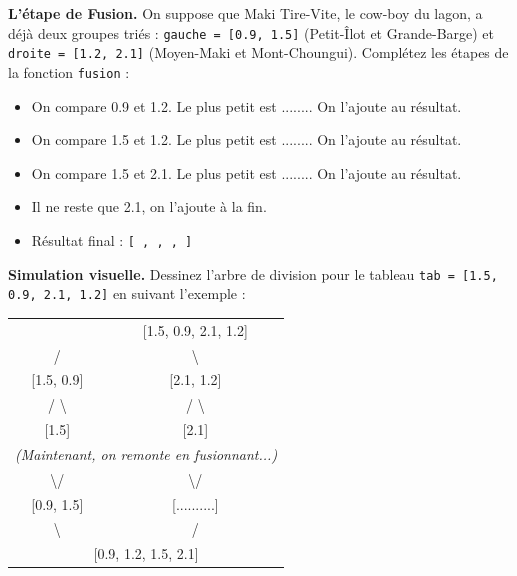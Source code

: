 \begin{Exercise}[title={La stratégie de Maki Tire-Vite, le cow-boy du lagon}]

\Question \textbf{L'étape de Fusion.} 
On suppose que Maki Tire-Vite, le cow-boy du lagon, a déjà deux groupes triés : \texttt{gauche = [0.9, 1.5]} (Petit-Îlot et Grande-Barge) et \texttt{droite = [1.2, 2.1]} (Moyen-Maki et Mont-Choungui).
Complétez les étapes de la fonction \texttt{fusion} :
\begin{itemize}
    \item On compare 0.9 et 1.2. Le plus petit est ........ On l'ajoute au résultat.
    \item On compare 1.5 et 1.2. Le plus petit est ........ On l'ajoute au résultat.
    \item On compare 1.5 et 2.1. Le plus petit est ........ On l'ajoute au résultat.
    \item Il ne reste que 2.1, on l'ajoute à la fin.
    \item Résultat final : \texttt{[ \quad , \quad , \quad , \quad ]}
\end{itemize}

\Question \textbf{Simulation visuelle.}
Dessinez l'arbre de division pour le tableau \texttt{tab = [1.5, 0.9, 2.1, 1.2]} en suivant l'exemple :



\begin{center}
\begin{tabular}{cc}
      & [1.5, 0.9, 2.1, 1.2] \\
     / & \textbackslash \\
    {[1.5, 0.9]} & {[2.1, 1.2]} \\
   / \quad \textbackslash & / \quad \textbackslash \\
  {[1.5]} \quad [0.9] & {[2.1]} \quad [1.2] \\
   \hline
   \multicolumn{2}{c}{\textit{(Maintenant, on remonte en fusionnant...)}} \\
   \textbackslash \quad / & \textbackslash \quad / \\
   {[0.9, 1.5]} & {[..........]} \\
    \textbackslash & / \\
    \multicolumn{2}{c}{[0.9, 1.2, 1.5, 2.1]} \\
\end{tabular}
\end{center}


\end{Exercise}

